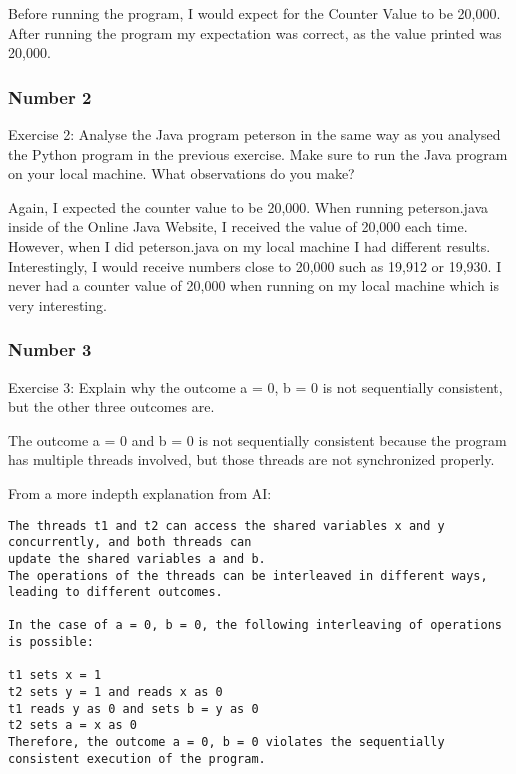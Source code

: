 \documentclass{article}
\theoremstyle{theorem}
\theoremstyle{definition}
\theoremstyle{remark}
\begin{document}
\noindent\newline\newline Before running the program, I would expect for the Counter Value to be 20,000. After running the program my expectation was correct, as the value printed was 20,000.


\subsubsection{Number 2}
\noindent\newline Exercise 2: Analyse the Java program peterson in the same way as you analysed the Python program in the previous exercise. Make sure to run the Java program on your local machine. What observations do you make? 

\noindent\newline\newline Again, I expected the counter value to be 20,000. When running peterson.java inside of the Online Java Website, I received the value of 20,000 each time. However, when I did peterson.java on my local machine I had different results. Interestingly, I would receive numbers close to 20,000 such as 19,912 or 19,930. I never had a counter value of 20,000 when running on my local machine which is very interesting.


\subsubsection{Number 3}
\noindent\newline Exercise 3: Explain why the outcome a = 0, b = 0 is not sequentially consistent, but the other three outcomes are.

\noindent\newline\newline The outcome a = 0 and b = 0 is not sequentially consistent because the program has multiple threads involved, but those threads are not synchronized properly.

\noindent\newline\newline From a more indepth explanation from AI: 
\begin{verbatim}
The threads t1 and t2 can access the shared variables x and y concurrently, and both threads can
update the shared variables a and b. 
The operations of the threads can be interleaved in different ways, leading to different outcomes.

In the case of a = 0, b = 0, the following interleaving of operations is possible:

t1 sets x = 1
t2 sets y = 1 and reads x as 0
t1 reads y as 0 and sets b = y as 0
t2 sets a = x as 0
Therefore, the outcome a = 0, b = 0 violates the sequentially consistent execution of the program.
\end{verbatim}
\end{document}
